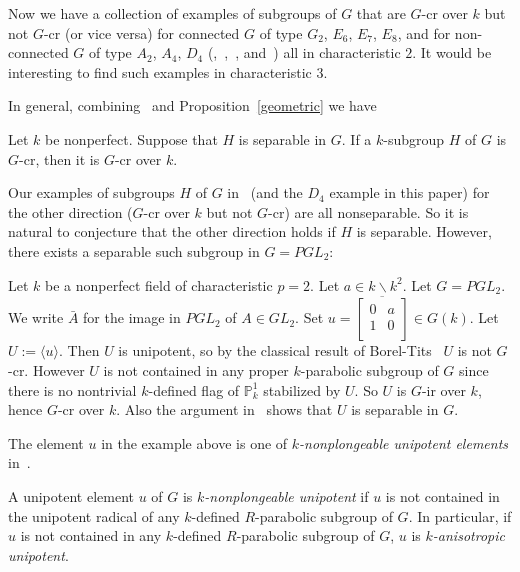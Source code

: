 \begin{rem}
Now we have a collection of examples of subgroups of $G$ that are $G$-cr over $k$ but not $G$-cr (or vice versa) for connected $G$ of type $G_2$, $E_6$, $E_7$, $E_8$, and for non-connected $G$ of type $A_2$, $A_4$, $D_4$ (\cite{Bate-separability-TransAMS},~\cite{Uchiyama-Nonperfect-pre},~\cite{Uchiyama-Classification-pre}, and~\cite{Uchiyama-Separability-JAlgebra}) all in characteristic $2$. It would be interesting to find such examples  in characteristic $3$.   
\end{rem}

In general, combining~\cite[Thm.~1.5]{Bate-cocharacter-Arx} and Proposition~\ref{geometric} we have
\begin{prop}
Let $k$ be nonperfect. Suppose that $H$ is separable in $G$. If a $k$-subgroup $H$ of $G$ is $G$-cr, then it is $G$-cr over $k$.
\end{prop}
Our examples of subgroups $H$ of $G$ in~\cite{Uchiyama-Nonperfect-pre} (and the $D_4$ example in this paper) for the other direction ($G$-cr over $k$ but not $G$-cr) are all nonseparable. So it is natural to conjecture that the other direction holds if $H$ is separable. However, there exists a separable such subgroup in $G=PGL_2$: 
\begin{example}\label{PGL-nonplongeable}
Let $k$ be a nonperfect field of characteristic $p=2$. Let $a\in k\backslash k^2$. Let $G=PGL_2$. We write $\bar A$ for the image in $PGL_2$ of $A\in GL_2$. Set $u= \overline{\left[\begin{array}{cc}
                        0 & a \\
                        1 & 0 \\
                         \end{array}  
                        \right]}\in G(k)$. Let $U:=\langle u \rangle$. Then $U$ is unipotent, so by the classical result of Borel-Tits~\cite[Prop.~3.1]{Borel-Tits-unipotent-invent} $U$ is not $G$-cr. However $U$ is not contained in any proper $k$-parabolic subgroup of $G$ since there is no nontrivial $k$-defined flag of $\mathbb{P}^1_k$ stabilized by $U$. So $U$ is $G$-ir over $k$, hence $G$-cr over $k$. Also the argument in~\cite[Ex.~7.6]{Bate-cocharacter-Arx} shows that $U$ is separable in $G$. 
\end{example}
The element $u$ in the example above is one of \emph{$k$-nonplongeable unipotent elements} in~\cite{Tits-unipotent-Utrecht}. 
\begin{defn}
A unipotent element $u$ of $G$ is \emph{$k$-nonplongeable unipotent} if $u$ is not contained in the unipotent radical of any $k$-defined $R$-parabolic subgroup of $G$. In particular, if $u$ is not contained in any $k$-defined $R$-parabolic subgroup of $G$, $u$ is \emph{$k$-anisotropic unipotent}. 
\end{defn}

